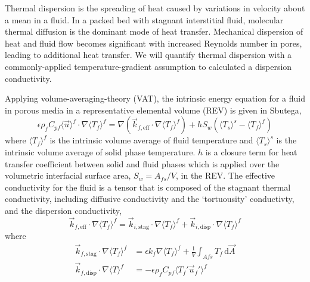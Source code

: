 Thermal dispersion is the spreading of heat caused by variations in velocity about a mean in a fluid. In a packed bed with stagnant interstitial fluid, molecular thermal diffusion is the dominant mode of heat transfer. Mechanical dispersion of heat and fluid flow becomes significant with increased Reynolds number in pores, leading to additional heat transfer. We will quantify thermal dispersion with a commonly-applied temperature-gradient assumption to calculated a dispersion conductivity.\cite{Kuwahara1996,Nakayama2006,Yang2010a}

Applying volume-averaging-theory (VAT), the intrinsic energy equation for a fluid in porous media in a representative elemental volume (REV) is given in Sbutega\etal\cite{Sbutega2013},
\begin{equation}
\epsilon\rho_fC_{pf}\langle\vec{u}\rangle^f\cdot\nabla\langle T_f\rangle^f = \nabla\left(\vec{k}_{f,\text{eff}}\cdot\nabla\langle T_f\rangle^f \right) + hS_w\left(\langle T_s\rangle^s - \langle T_f\rangle^f\right)
\end{equation}
where $\langle T_f\rangle^f$ is the intrinsic volume average of fluid temperature and $\langle T_s\rangle^s$ is the intrinsic volume average of solid phase temperature. $h$ is a closure term for heat transfer coefficient between solid and fluid phases which is applied over the volumetric interfacial surface area, $S_w = A_{fs}/V$, in the REV. The effective conductivity for the fluid is a tensor that is composed of the stagnant thermal conductivity, including diffusive conductivity and the `tortuousity' conductivty, and the dispersion conductivity,
\begin{equation}
\vec{k}_{f,\text{eff}} \cdot\nabla\langle T_f\rangle^f  = \vec{k}_{i,\text{stag}}\cdot\nabla\langle T_f\rangle^f + \vec{k}_{i,\text{disp}}\cdot\nabla\langle T_f\rangle^f 
\end{equation}
where
\begin{align}
\vec{k}_{f,\text{stag}}\cdot\nabla\langle T_f\rangle^f &= \epsilon k_f \nabla\langle T_f\rangle^f + \frac{1}{V}\int_{Afs}\! T_f \,\mathrm{d}\vec{A} \\
\vec{k}_{f,\text{disp}} \cdot \nabla \langle T\rangle^f &= -\epsilon\rho_f C_{pf}\langle T_f' \vec{u}_f'\rangle^f
\end{align}

